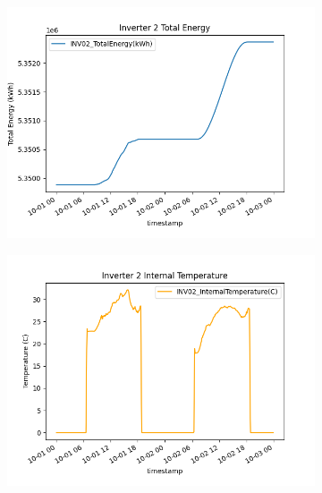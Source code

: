 \begin{figure}[H]
	\centering
	\begin{subfigure}[t]{0.45\textwidth}
		\centering
		\includegraphics[width=\textwidth, keepaspectratio]{chapters/1_introduction/imgs/inv2totenergy.png}
		\caption{}
		\label{fig:inv02totenergy}
	\end{subfigure}
	\hspace{0.5cm}
	\begin{subfigure}[t]{0.45\textwidth}
		\centering
		\includegraphics[width=\textwidth, keepaspectratio]{chapters/1_introduction/imgs/inv2temperature.png}
		\caption{}
		\label{fig:inv02temp}
	\end{subfigure}\\


\end{figure}
